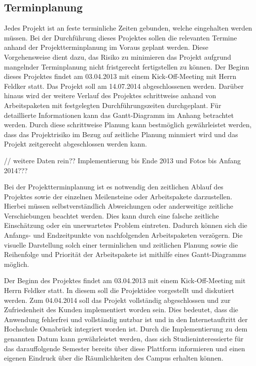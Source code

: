 \subsection{Terminplanung}
\label{sec:Terminplanung}

Jedes Projekt ist an feste terminliche Zeiten gebunden, welche eingehalten werden müssen. Bei der Durchführung dieses 
Projektes sollen die relevanten Termine anhand der Projektterminplanung im Voraus geplant werden. Diese Vorgehensweise 
dient dazu, das Risiko zu minimieren das Projekt aufgrund mangelnder Terminplanung nicht fristgerecht fertigstellen zu 
können. 
Der Beginn dieses Projektes findet am 03.04.2013 mit einem Kick-Off-Meeting mit Herrn Feldker statt. Das Projekt soll am 14.07.2014 abgeschlossenen werden. Darüber hinaus wird der weitere Verlauf des Projektes schrittweise anhand von 
Arbeitspaketen mit festgelegten Durchführungszeiten durchgeplant. Für detaillierte Informationen kann das Gantt-Diagramm 
im Anhang betrachtet werden.
Durch diese schrittweise Planung kann bestmöglich gewährleistet werden, dass das  Projektrisiko im Bezug auf zeitliche 
Planung minmiert wird und das Projekt zeitgerecht abgeschlossen werden kann.

// weitere Daten rein?? Implementierung bis Ende 2013 und Fotos bis Anfang 2014???

Bei der Projektterminplanung ist es notwendig den zeitlichen Ablauf des Projektes sowie der einzelnen Meilensteine oder 
Arbeitspakete darzustellen. Hierbei müssen selbstverständlich Abweichungen oder anderweitige zeitliche Verschiebungen 
beachtet werden. Dies kann durch eine falsche zeitliche Einschätzung oder ein unerwartetes Problem eintreten. Dadurch 
können sich die Anfangs- und Endzeitpunkte von nachfolgenden Arbeitspaketen verzögern. Die visuelle Darstellung solch 
einer terminlichen und zeitlichen Planung sowie die Reihenfolge und Priorität der Arbeitspakete ist mithilfe eines Gantt-Diagramms möglich.

Der Beginn des Projektes findet am 03.04.2013 mit einem Kick-Off-Meeting mit Herrn Feldker statt. In diesem soll die 
Projektidee vorgestellt und diskutiert werden.
Zum 04.04.2014 soll das Projekt vollständig abgeschlossen und zur Zufriedenheit des Kunden implementiert worden sein. Dies 
bedeutet, dass die Anwendung fehlerfrei und vollständig nutzbar ist und in den Internetauftritt der Hochschule Osnabrück 
integriert worden ist. Durch die Implementierung zu dem genannten Datum kann gewährleistet werden, dass sich 
Studieninteressierte für das darauffolgende Semester bereits über diese Plattform informieren und einen eigenen Eindruck 
über die Räumlichkeiten des Campus erhalten können. 

